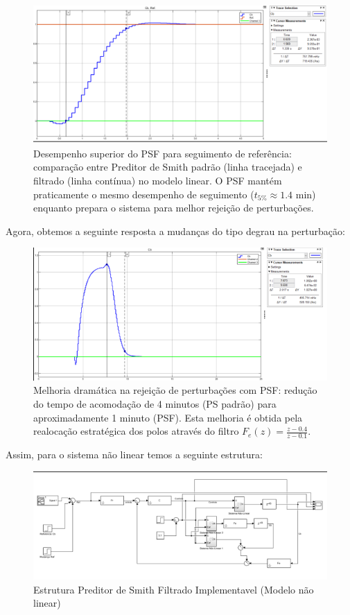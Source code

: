 \documentclass[a4paper,12pt]{article}
\begin{document}
\begin{figure}[H]
    \centering
    \includegraphics[width=0.9\linewidth]{image4.png}
    \caption{Desempenho superior do PSF para seguimento de referência: comparação entre Preditor de Smith padrão (linha tracejada) e filtrado (linha contínua) no modelo linear. O PSF mantém praticamente o mesmo desempenho de seguimento ($t_{5\%} \approx 1.4$ min) enquanto prepara o sistema para melhor rejeição de perturbações.}
    \label{fig:psf_step_response_ref}
\end{figure}

Agora, obtemos a seguinte resposta a mudanças do tipo degrau na perturbação:

\begin{figure}[H]
    \centering
    \includegraphics[width=0.9\linewidth]{image5.png}
    \caption{Melhoria dramática na rejeição de perturbações com PSF: redução do tempo de acomodação de 4 minutos (PS padrão) para aproximadamente 1 minuto (PSF). Esta melhoria é obtida pela realocação estratégica dos polos através do filtro $F_e(z) = \frac{z-0.4}{z-0.1}$.}
    \label{fig:psf_step_response_disturbance}
\end{figure}

Assim, para o sistema não linear temos a seguinte estrutura:

\begin{figure}[H]
    \centering
    \includegraphics[width=0.9\linewidth]{image6.png}
    \caption{Estrutura Preditor de Smith Filtrado Implementavel (Modelo não linear)}
    \label{fig:psf_nonlinear_structure}
\end{figure}
\end{document}
